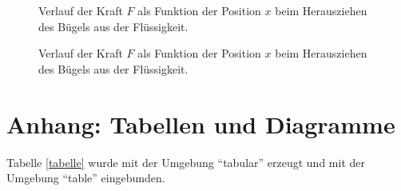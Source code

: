 \documentclass[11pt,a4paper]{article}
\begin{document}
\begin{figure}[p]
\centering
{}
\caption{Verlauf der Kraft $F$ als Funktion der Position $x$ beim Herausziehen des B\"ugels aus der Fl\"ussigkeit.}
\label{abbildung}
\end{figure}

\begin{figure}[p]
\centering
{}
\caption{Verlauf der Kraft $F$ als Funktion der Position $x$ beim Herausziehen des B\"ugels aus der Fl\"ussigkeit.}
\label{abbildung}
\end{figure}


\section{Anhang: Tabellen und Diagramme}

Tabelle \ref{tabelle} wurde mit der Umgebung "`tabular"' erzeugt
und mit der Umgebung "`table"' eingebunden.  
\end{document}
